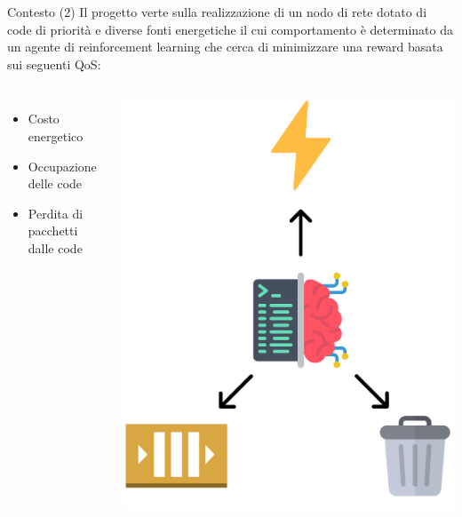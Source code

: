 \documentclass[compress]{beamer}
\begin{document}
\begin{frame}{Contesto (2)}
    Il progetto verte sulla realizzazione di un nodo di rete dotato di code di priorità e diverse fonti energetiche il cui comportamento è determinato da un agente di reinforcement learning che cerca di minimizzare una reward basata sui seguenti QoS:
    \begin{columns}
            \begin{minipage}[b]{1\textwidth}
                \begin{itemize}
                    \item Costo energetico
                    \item Occupazione delle code
                    \item Perdita di pacchetti dalle code 
                \end{itemize}
            \end{minipage}
                \begin{minipage}{1\textwidth}
                    \begin{adjustbox}{margin=0cm 0cm 0cm 0cm, center} %
                        \includegraphics[width=.65\textwidth]{figs/agent_icon.png}
                    \end{adjustbox}
                \end{minipage}
    \end{columns}
\end{frame}
\end{document}
